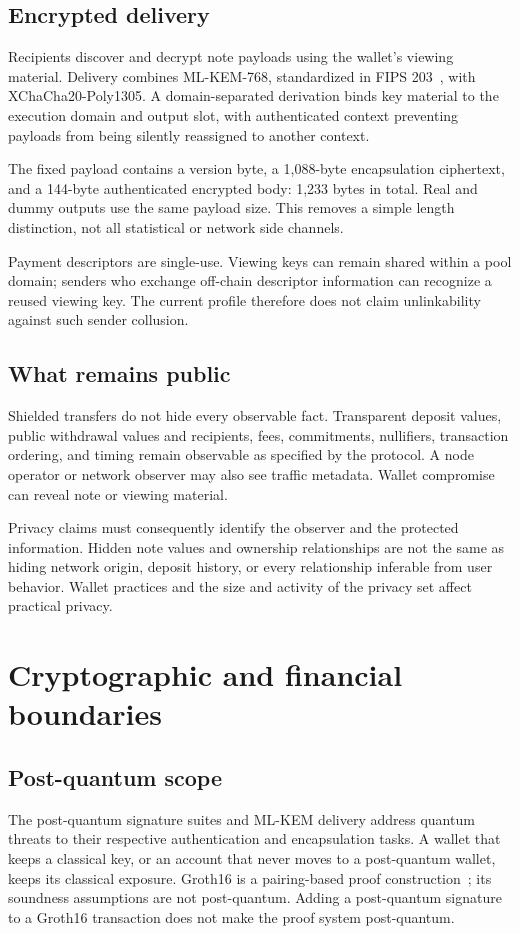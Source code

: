 \documentclass[11pt,a4paper]{article}
\begin{document}
\subsection{Encrypted delivery}
Recipients discover and decrypt note payloads using the wallet's viewing
material. Delivery combines ML-KEM-768, standardized in FIPS 203~\cite{fips203},
with XChaCha20-Poly1305. A domain-separated derivation binds key material to
the execution domain and output slot, with authenticated context preventing
payloads from being silently reassigned to another context.

The fixed payload contains a version byte, a 1,088-byte encapsulation
ciphertext, and a 144-byte authenticated encrypted body: 1,233 bytes in total.
Real and dummy outputs use the same payload size. This removes a simple
length distinction, not all statistical or network side channels.

Payment descriptors are single-use. Viewing keys can remain shared within a
pool domain; senders who exchange off-chain descriptor information can
recognize a reused viewing key. The current profile therefore does not claim
unlinkability against such sender collusion.

\subsection{What remains public}
Shielded transfers do not hide every observable fact. Transparent deposit
values, public withdrawal values and recipients, fees, commitments,
nullifiers, transaction ordering, and timing remain observable as specified
by the protocol. A node operator or network observer may also see traffic
metadata. Wallet compromise can reveal note or viewing material.

Privacy claims must consequently identify the observer and the protected
information. Hidden note values and ownership relationships are not the same
as hiding network origin, deposit history, or every relationship inferable
from user behavior. Wallet practices and the size and activity of the privacy
set affect practical privacy.

\section{Cryptographic and financial boundaries}
\subsection{Post-quantum scope}
The post-quantum signature suites and ML-KEM delivery address quantum threats
to their respective authentication and encapsulation tasks. A wallet that
keeps a classical key, or an account that never moves to a post-quantum
wallet, keeps its classical exposure. Groth16 is a pairing-based
proof construction~\cite{groth16}; its soundness assumptions are not
post-quantum. Adding a post-quantum signature to a Groth16 transaction does
not make the proof system post-quantum.
\end{document}
